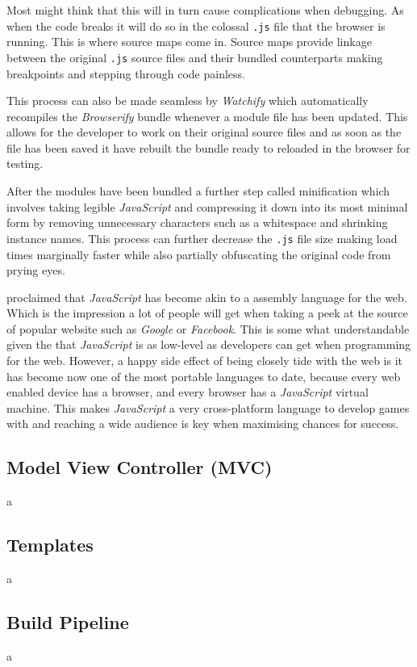 \documentclass[final]{cmpreport}
\begin{document}
Most might think that this will in turn cause complications when debugging. As when the code breaks it will do so in the colossal \texttt{.js} file that the browser is running. This is where source maps come in. Source maps provide linkage between the original \texttt{.js} source files and their bundled counterparts making breakpoints and stepping through code painless. \cite{Seddon}

This process can also be made seamless by \textit{Watchify} which automatically recompiles the \textit{Browserify} bundle whenever a module file has been updated. This allows for the developer to work on their original source files and as soon as the file has been saved it have rebuilt the bundle ready to reloaded in the browser for testing.

After the modules have been bundled a further step called minification which involves taking legible \textit{JavaScript} and compressing it down into its most minimal form by removing unnecessary characters such as a whitespace and shrinking instance names. This process can further decrease the \texttt{.js} file size making load times marginally faster while also partially obfuscating the original code from prying eyes.

\cite{Hanselman} proclaimed that \textit{JavaScript} has become akin to a assembly language for the web. Which is the impression a lot of people will get when taking a peek at the source of popular website such as \textit{Google} or \textit{Facebook}. This is some what understandable given the that \textit{JavaScript} is as low-level as developers can get when programming for the web. However, a happy side effect of being closely tide with the web is it has become now one of the most portable languages to date, because every web enabled device has a browser, and every browser has a \textit{JavaScript} virtual machine. This makes \textit{JavaScript} a very cross-platform language to develop games with and reaching a wide audience is key when maximising chances for success.

\subsection{Model View Controller (MVC)}
a

\subsection{Templates}
a

\subsection{Build Pipeline}
a
\end{document}
